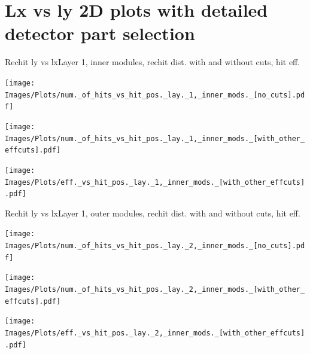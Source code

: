 \documentclass{beamer}
\begin{document}
\section{Lx vs ly 2D plots with detailed detector part selection}

\begin{frame}{Rechit ly vs lx}{Layer 1, inner modules, rechit dist. with and without cuts, hit eff.}
  \begin{minipage}{0.32\textwidth}
    \centering
    \texttt{[image: Images/Plots/num.\_of\_hits\_vs\_hit\_pos.\_lay.\_1,\_inner\_mods.\_[no\_cuts].pdf]}
  \end{minipage}%
  \begin{minipage}{0.32\textwidth}
    \centering
    \texttt{[image: Images/Plots/num.\_of\_hits\_vs\_hit\_pos.\_lay.\_1,\_inner\_mods.\_[with\_other\_effcuts].pdf]}
  \end{minipage}%
  \begin{minipage}{0.32\textwidth}
    \centering
    \texttt{[image: Images/Plots/eff.\_vs\_hit\_pos.\_lay.\_1,\_inner\_mods.\_[with\_other\_effcuts].pdf]}
  \end{minipage}
\end{frame}

\begin{frame}{Rechit ly vs lx}{Layer 1, outer modules, rechit dist. with and without cuts, hit eff.}
  \begin{minipage}{0.32\textwidth}
    \centering
    \texttt{[image: Images/Plots/num.\_of\_hits\_vs\_hit\_pos.\_lay.\_2,\_inner\_mods.\_[no\_cuts].pdf]}
  \end{minipage}%
  \begin{minipage}{0.32\textwidth}
    \centering
    \texttt{[image: Images/Plots/num.\_of\_hits\_vs\_hit\_pos.\_lay.\_2,\_inner\_mods.\_[with\_other\_effcuts].pdf]}
  \end{minipage}%
  \begin{minipage}{0.32\textwidth}
    \centering
    \texttt{[image: Images/Plots/eff.\_vs\_hit\_pos.\_lay.\_2,\_inner\_mods.\_[with\_other\_effcuts].pdf]}
  \end{minipage}
\end{frame}
\end{document}
